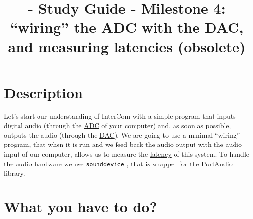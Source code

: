 
\title{\TM{} - Study Guide - Milestone 4: ``wiring'' the ADC with the DAC, and measuring latencies (obsolete)}

\maketitle

\section{Description}

Let's start our understanding of InterCom with a simple program that
inputs digital audio (through the
\href{https://en.wikipedia.org/wiki/Analog-to-digital_converter}{ADC}
of your computer) and, as soon as possible, outputs the audio (through
the
\href{https://en.wikipedia.org/wiki/Digital-to-analog_converter}{DAC}). We
are going to use a minimal ``wiring'' program, that when it is run and
we feed back the audio output with the audio input of our computer,
allows us to measure the
\href{https://en.wikipedia.org/wiki/Latency_(engineering)}{latency} of
this system. To handle the audio hardware we use
\href{https://python-sounddevice.readthedocs.io}{\texttt{sounddevice}}
\cite{sounddevice}, that is wrapper for the
\href{http://www.portaudio.com/}{PortAudio} library.

\section{What you have to do?}

